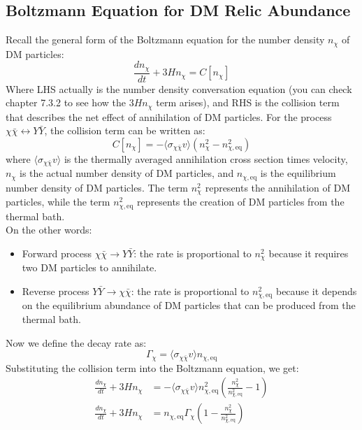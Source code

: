 \subsection{Boltzmann Equation for DM Relic Abundance}
\begin{foundation}
    Recall the general form of the Boltzmann equation for the number density $n_\chi$ of DM particles:
    \[
        \frac{dn_\chi}{dt} + 3H n_\chi = C[n_\chi]
    \]
    Where LHS actually is the number density conversation equation (you can check chapter 7.3.2 to see how the $3H n_\chi$ term arises), and RHS is the collision term that describes the net effect of annihilation of DM particles. For the process $\chi \bar{\chi} \leftrightarrow Y \bar{Y}$, the collision term can be written as:
    \[
        C[n_\chi] = -\langle \sigma_{\chi \bar{\chi}} v \rangle (n_\chi^2 - n_{\chi,\mathrm{eq}}^2)
    \]
    where $\langle \sigma_{\chi \bar{\chi}} v \rangle$ is the thermally averaged annihilation cross section times velocity, $n_\chi$ is the actual number density of DM particles, and $n_{\chi,\mathrm{eq}}$ is the equilibrium number density of DM particles. The term $n_\chi^2$ represents the annihilation of DM particles, while the term $n_{\chi,\mathrm{eq}}^2$ represents the creation of DM particles from the thermal bath. \\

    On the other words:
    \begin{itemize}
        \item Forward process $\chi \bar{\chi} \to Y \bar{Y}$: the rate is proportional to $n_\chi^2$ because it requires two DM particles to annihilate.
        \item Reverse process $Y \bar{Y} \to \chi \bar{\chi}$: the rate is proportional to $n_{\chi,\mathrm{eq}}^2$ because it depends on the equilibrium abundance of DM particles that can be produced from the thermal bath.
    \end{itemize}

    Now we define the decay rate as:
    \[
        \Gamma_{\chi} = \langle \sigma_{\chi \bar{\chi}} v \rangle n_{\chi,\mathrm{eq}}
    \]
    Substituting the collision term into the Boltzmann equation, we get:
    \begin{align*}
        \frac{dn_\chi}{dt} + 3H n_\chi &= - \langle \sigma_{\chi \bar{\chi}} v \rangle n_{\chi,\mathrm{eq}}^2 \left( \frac{n_\chi^2}{n_{\chi,\mathrm{eq}}^2} - 1 \right) \\
        \frac{dn_\chi}{dt} + 3H n_\chi &= n_{\chi,\mathrm{eq}} \Gamma_\chi \left( 1 - \frac{n_\chi^2}{n_{\chi,\mathrm{eq}}^2} \right)
    \end{align*}
\end{foundation}

